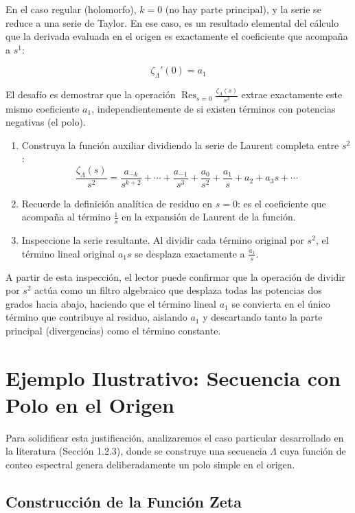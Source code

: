 \documentclass{article}
\begin{document}
En el caso regular (holomorfo), $k=0$ (no hay parte principal), y la serie se reduce a una serie de Taylor. En ese caso, es un resultado elemental del cálculo que la derivada evaluada en el origen es exactamente el coeficiente que acompaña a $s^1$:

\[
\zeta_\Lambda'(0) = a_1
\]

El desafío es demostrar que la operación $\operatorname{Res}_{s=0} \frac{\zeta_\Lambda(s)}{s^2}$ extrae exactamente este mismo coeficiente $a_1$, independientemente de si existen términos con potencias negativas (el polo).

\begin{enumerate}
    \item Construya la función auxiliar dividiendo la serie de Laurent completa entre $s^2$:
    \[
    \frac{\zeta_\Lambda(s)}{s^2} = \frac{a_{-k}}{s^{k+2}} + \cdots + \frac{a_{-1}}{s^3} + \frac{a_0}{s^2} + \frac{a_1}{s} + a_2 + a_3 s + \cdots
    \]
    \item Recuerde la definición analítica de residuo en $s=0$: es el coeficiente que acompaña al término $\frac{1}{s}$ en la expansión de Laurent de la función.
    \item Inspeccione la serie resultante. Al dividir cada término original por $s^2$, el término lineal original $a_1 s$ se desplaza exactamente a $\frac{a_1}{s}$. 
\end{enumerate}

A partir de esta inspección, el lector puede confirmar que la operación de dividir por $s^2$ actúa como un filtro algebraico que desplaza todas las potencias dos grados hacia abajo, haciendo que el término lineal $a_1$ se convierta en el único término que contribuye al residuo, aislando $a_1$ y descartando tanto la parte principal (divergencias) como el término constante.

\section{Ejemplo Ilustrativo: Secuencia con Polo en el Origen}

Para solidificar esta justificación, analizaremos el caso particular desarrollado en la literatura (Sección 1.2.3), donde se construye una secuencia $\Lambda$ cuya función de conteo espectral genera deliberadamente un polo simple en el origen.

\subsection{Construcción de la Función Zeta}
\end{document}
